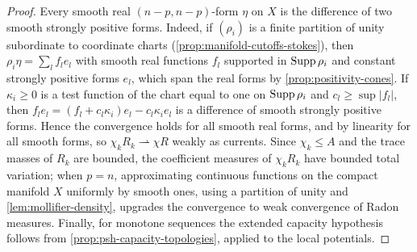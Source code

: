 \begin{proof}
Every smooth real $(n-p,n-p)$-form $\eta$ on $X$ is the difference of two smooth strongly positive forms. Indeed, if $(\rho_i)$ is a finite partition of unity subordinate to coordinate charts (\cref{prop:manifold-cutoffs-stokes}), then $\rho_i\eta=\sum_lf_le_l$ with smooth real functions $f_l$ supported in $\operatorname{Supp}\rho_i$ and constant strongly positive forms $e_l$, which span the real forms by \cref{prop:positivity-cones}. If $\kappa_i\geq0$ is a test function of the chart equal to one on $\operatorname{Supp}\rho_i$ and $c_l\geq\sup|f_l|$, then $f_le_l=(f_l+c_l\kappa_i)e_l-c_l\kappa_ie_l$ is a difference of smooth strongly positive forms. Hence the convergence holds for all smooth real forms, and by linearity for all smooth forms, so $\chi_kR_k\rightharpoonup\chi R$ weakly as currents. Since $\chi_k\leq A$ and the trace masses of $R_k$ are bounded, the coefficient measures of $\chi_kR_k$ have bounded total variation; when $p=n$, approximating continuous functions on the compact manifold $X$ uniformly by smooth ones, using a partition of unity and \cref{lem:mollifier-density}, upgrades the convergence to weak convergence of Radon measures. Finally, for monotone sequences the extended capacity hypothesis follows from \cref{prop:psh-capacity-topologies}, applied to the local potentials.
\end{proof}
